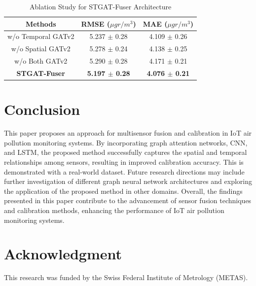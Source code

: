 \documentclass[conference,a4paper]{IEEEtran}
\begin{document}
\begin{table}
    \begin{center}
    \caption{Ablation Study for STGAT-Fuser Architecture}
    \label{tab:tab2}
\begin{tabular}{ccc} \toprule
    {Methods} & {RMSE ($\mu gr / m^3$)} & {MAE ($\mu gr / m^3$)} \\ \midrule
    w/o Temporal GATv2  & 5.237 $\pm$ 0.28 & 4.109 $\pm$ 0.26  \\
    w/o Spatial GATv2  & 5.278 $\pm$ 0.24 & 4.138 $\pm$ 0.25   \\
    w/o Both GATv2  & 5.290 $\pm$ 0.28  & 4.171 $\pm$ 0.21 \\ \midrule
    \textbf{STGAT-Fuser}  & \textbf{5.197 $\pm$ 0.28}  & \textbf{4.076 $\pm$ 0.21} 
    \\
        \bottomrule
\end{tabular}
\end{center}
\end{table}

\section{Conclusion}
\label{sec:conclusion}
This paper proposes an approach for multisensor fusion and calibration in IoT air pollution monitoring systems. By incorporating graph attention networks, CNN, and LSTM, the proposed method successfully captures the spatial and temporal relationships among sensors, resulting in improved calibration accuracy. This is  demonstrated with a real-world dataset. Future research directions may include further investigation of different graph neural network architectures and exploring the application of the proposed method in other domains. Overall, the findings presented in this paper contribute to the advancement of sensor fusion techniques and calibration methods, enhancing the performance of IoT air pollution monitoring systems.

\section*{Acknowledgment}
This research was funded by the Swiss Federal Institute of Metrology (METAS).



\end{document}
